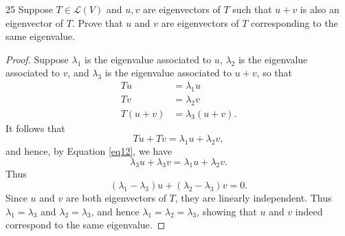 \documentclass{extarticle}
\newenvironment{problem}[1]{\begin{prob*}{#1}{}}{\end{prob*}}
\newcommand{\Hom}{\mathcal{L}}
\begin{document}
\begin{problem}{25}
Suppose $T\in\Hom(V)$ and $u,v$ are eigenvectors of $T$ such that $u+v$ is also an eigenvector of $T$.  Prove that $u$ and $v$ are eigenvectors of $T$ corresponding to the same eigenvalue.
\end{problem}
\begin{proof}
Suppose $\lambda_1$ is the eigenvalue associated to $u$, $\lambda_2$ is the eigenvalue associated to $v$, and $\lambda_3$ is the eigenvalue associated to $u+v$, so that
\begin{align}
Tu &= \lambda_1 u \label{eq10}\\
Tv &= \lambda_2 v \label{eq11}\\
T(u+v) &= \lambda_3(u+v). \label{eq12}
\end{align}
It follows that
\begin{equation*}
Tu + Tv = \lambda_1 u + \lambda_2 v,
\end{equation*}
and hence, by Equation \ref{eq12}, we have
\begin{equation*}
\lambda_3 u + \lambda_3 v = \lambda_1 u + \lambda_2 v.
\end{equation*}
Thus 
\begin{equation*}
(\lambda_1 - \lambda_3)u + (\lambda_2 - \lambda_3)v = 0.
\end{equation*}
Since $u$ and $v$ are both eigenvectors of $T$, they are linearly independent.  Thus $\lambda_1 = \lambda_3$ and $\lambda_2 = \lambda_3$, and hence $\lambda_1 = \lambda_2 = \lambda_3$, showing that $u$ and $v$ indeed correspond to the same eigenvalue.
\end{proof}
\end{document}
